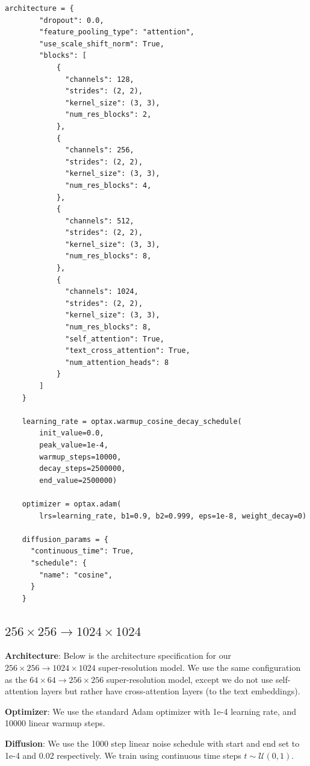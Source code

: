 \begin{Verbatim}[fontsize=\scriptsize]
    architecture = {
        "dropout": 0.0,
        "feature_pooling_type": "attention",
        "use_scale_shift_norm": True,
        "blocks": [
            {
              "channels": 128,
              "strides": (2, 2),
              "kernel_size": (3, 3),
              "num_res_blocks": 2,
            },
            {
              "channels": 256,
              "strides": (2, 2),
              "kernel_size": (3, 3),
              "num_res_blocks": 4,
            },
            {
              "channels": 512,
              "strides": (2, 2),
              "kernel_size": (3, 3),
              "num_res_blocks": 8,
            },
            {
              "channels": 1024,
              "strides": (2, 2),
              "kernel_size": (3, 3),
              "num_res_blocks": 8,
              "self_attention": True,
              "text_cross_attention": True,
              "num_attention_heads": 8
            }
        ]
    }

    learning_rate = optax.warmup_cosine_decay_schedule(
        init_value=0.0,
        peak_value=1e-4,
        warmup_steps=10000,
        decay_steps=2500000,
        end_value=2500000)
    
    optimizer = optax.adam(
        lrs=learning_rate, b1=0.9, b2=0.999, eps=1e-8, weight_decay=0)
    
    diffusion_params = {
      "continuous_time": True,
      "schedule": {
        "name": "cosine",
      }
    }
\end{Verbatim}

\subsection{$256\times256 \rightarrow 1024\times1024$}
\textbf{Architecture}: Below is the architecture specification for our $256\times256 \rightarrow 1024\times1024$ super-resolution model. We use the same configuration as the $64\times64 \rightarrow 256\times256$ super-resolution model, except we do not use self-attention layers but rather have cross-attention layers (to the text embeddings). 

\textbf{Optimizer}: We use the standard Adam optimizer with 1e-4 learning rate, and 10000 linear warmup steps.

\textbf{Diffusion}: We use the 1000 step linear noise schedule with start and end set to 1e-4 and 0.02 respectively. We train using continuous time steps $t \sim \mathcal{U}(0, 1)$.

